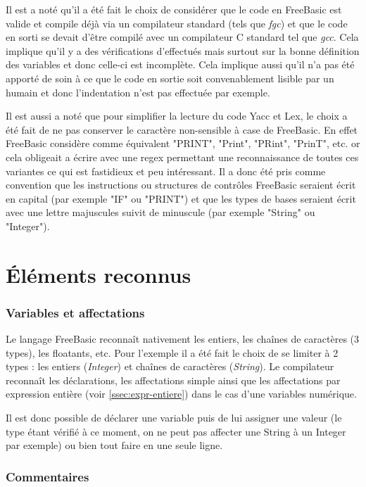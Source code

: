 \documentclass[french]{article}
\begin{document}
Il est a noté qu'il a été fait le choix de considérer que le code en FreeBasic est valide et compile déjà via un compilateur standard (tels que \emph{fgc}) et que le code en sorti se devait d'être compilé avec un compilateur C standard tel que \emph{gcc}. Cela implique qu'il y a des vérifications d'effectués mais surtout sur la bonne définition des variables et donc celle-ci est incomplète. Cela implique aussi qu'il n'a pas été apporté de soin à ce que le code en sortie soit convenablement lisible par un humain et donc l'indentation n'est pas effectuée par exemple.

Il est aussi a noté que pour simplifier la lecture du code Yacc et Lex, le choix a été fait de ne pas conserver le caractère non-sensible à case de FreeBasic. En effet FreeBasic considère comme équivalent "PRINT", "Print", "PRint", "PrinT", etc. or cela obligeait a écrire avec une regex permettant une reconnaissance de toutes ces variantes ce qui est fastidieux et peu intéressant. Il a donc été pris comme convention que les instructions ou structures de contrôles FreeBasic seraient écrit en capital (par exemple "IF" ou "PRINT") et que les types de bases seraient écrit avec une lettre majuscules suivit de minuscule (par exemple "String" ou "Integer").

\part{Éléments reconnus}

\section{Variables et affectations}

Le langage FreeBasic reconnaît nativement les entiers, les chaînes de caractères (3 types), les floatants, etc. Pour l'exemple il a été fait le choix de se limiter à 2 types : les entiers (\emph{Integer}) et chaînes de caractères (\emph{String}). Le compilateur reconnaît les déclarations, les affectations simple ainsi que les affectations par expression entière (voir \ref{ssec:expr-entiere}) dans le cas d'une variables numérique.

Il est donc possible de déclarer une variable puis de lui assigner une valeur (le type étant vérifié à ce moment, on ne peut pas affecter une String à un Integer par exemple) ou bien tout faire en une seule ligne.

\section{Commentaires}
\end{document}
